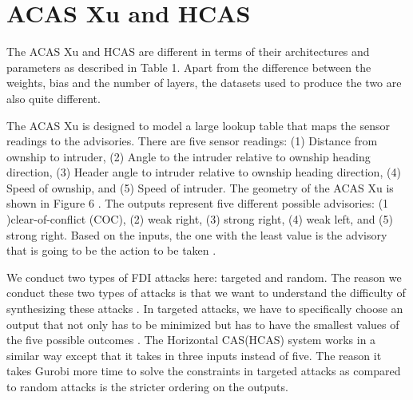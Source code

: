 \section{ACAS Xu and HCAS}
The ACAS Xu and HCAS are different  in terms of their architectures and parameters as described in Table 1. Apart from the difference between the weights, bias and the number of layers, the datasets used to produce the two are also quite different.  

The ACAS Xu is designed to model a large lookup table that maps the sensor readings to the advisories. There are five sensor readings:  (1) Distance from ownship to intruder, (2) Angle to the intruder relative to ownship heading direction, (3) Header angle to intruder relative to ownship  heading direction, (4) Speed of ownship, and (5) Speed of intruder. The geometry of the ACAS Xu is shown in Figure 6 . The outputs represent five different possible advisories: (1 )clear-of-conflict (COC), (2) weak right, (3) strong right, (4) weak left, and (5) strong right. Based on the inputs, the one with the least value is the advisory that is going to be the action to be taken . 

We conduct two types of FDI attacks here: targeted and random. The reason we conduct these two types of attacks is that we want to understand the difficulty of synthesizing these attacks . In targeted attacks, we have to specifically choose an output that not only has to be minimized but has to have the smallest values of the five possible outcomes . The Horizontal CAS(HCAS) system works in a similar way except that it takes in three inputs instead of five. %
The reason it takes Gurobi more time to solve the constraints in targeted attacks as compared to random attacks is the stricter ordering on the outputs. 

